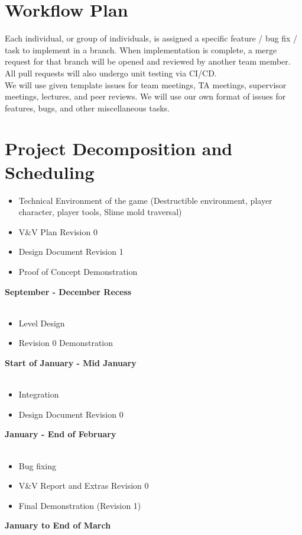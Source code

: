 \documentclass{article}
\begin{document}
\section{Workflow Plan}

Each individual, or group of individuals, is assigned a specific feature / bug fix / task to implement in a branch. When implementation is complete, a merge request for that branch will be opened and reviewed by another team member. All pull requests will also undergo unit testing via CI/CD.\\

We will use given template issues for team meetings, TA meetings, supervisor meetings, lectures, and peer reviews. We will use our own format of issues for features, bugs, and other miscellaneous tasks.


\section{Project Decomposition and Scheduling}

\begin{itemize}
\item{Technical Environment of the game (Destructible environment, player character, player tools, Slime mold traversal)}
\item{V\&V Plan Revision 0}
\item{Design Document Revision 1}
\item{Proof of Concept Demonstration}
\end{itemize}
\textbf{September - December Recess}
\\
\\
\begin{itemize}
\item{Level Design}
\item{Revision 0 Demonstration}
\end{itemize}
\textbf{Start of January - Mid January}
\\
\\
\begin{itemize}
\item{Integration}
\item{Design Document Revision 0}
\end{itemize}
\textbf{January - End of February}
\\
\\
\begin{itemize}
\item{Bug fixing}
\item{V\&V Report and Extras Revision 0}
\item{Final Demonstration (Revision 1)}
\end{itemize}
\textbf{January to End of March}\\
\end{document}
